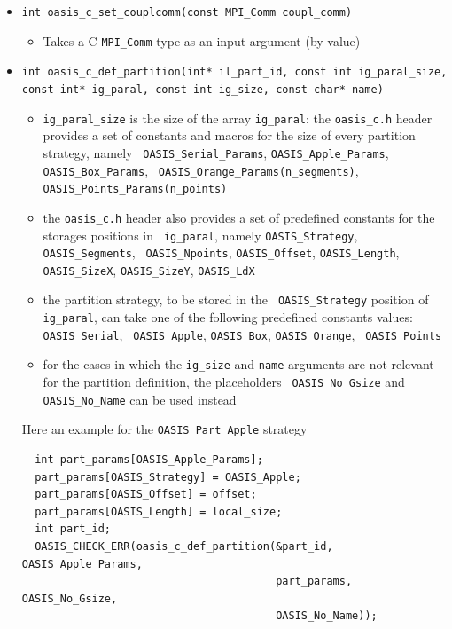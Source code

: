 \begin{itemize}
\begin{itemize}
  \item {\tt coupl\_comm} is a C {\tt MPI\_Comm*} type output argument (by reference)
  \end{itemize}

\vspace{0.2cm}
\item {\tt int oasis\_c\_set\_couplcomm(const MPI\_Comm coupl\_comm)}
  \begin{itemize}
  \item Takes a C {\tt MPI\_Comm} type as an input argument (by value)
  \end{itemize}

\vspace{0.2cm}
\item {\tt int oasis\_c\_def\_partition(int* il\_part\_id, const int ig\_paral\_size, const int* ig\_paral, const int ig\_size, const char* name)}
  \begin{itemize}
  \item {\tt ig\_paral\_size} is the size of the array {\tt ig\_paral}: the
    {\tt oasis\_c.h} header provides a set of constants and macros for
    the size of every partition strategy, namely {\tt
      OASIS\_Serial\_Params}, {\tt OASIS\_Apple\_Params}, {\tt
      OASIS\_Box\_Params}, {\tt
      OASIS\_Orange\_Params(n\_segments)}, {\tt
      OASIS\_Points\_Params(n\_points)}
  \item the {\tt oasis\_c.h} header also provides a set of predefined
    constants for the storages positions in {\tt
    ig\_paral}, namely {\tt OASIS\_Strategy}, {\tt OASIS\_Segments}, {\tt
    OASIS\_Npoints}, {\tt OASIS\_Offset}, {\tt OASIS\_Length}, {\tt
    OASIS\_SizeX}, {\tt OASIS\_SizeY}, {\tt OASIS\_LdX}
  \item the partition strategy, to be stored in the {\tt
    OASIS\_Strategy} position of {\tt ig\_paral}, can take one of the
    following predefined constants values: {\tt OASIS\_Serial}, {\tt
      OASIS\_Apple}, {\tt OASIS\_Box}, {\tt OASIS\_Orange}, {\tt
      OASIS\_Points}
  \item for the cases in which the {\tt ig\_size} and {\tt name}
    arguments are
    not relevant for the partition definition, the placeholders {\tt
      OASIS\_No\_Gsize} and {\tt OASIS\_No\_Name} can be used instead
  \end{itemize}
  Here an example for the {\tt OASIS\_Part\_Apple} strategy
\begin{verbatim}
  int part_params[OASIS_Apple_Params];
  part_params[OASIS_Strategy] = OASIS_Apple;
  part_params[OASIS_Offset] = offset;
  part_params[OASIS_Length] = local_size;
  int part_id;
  OASIS_CHECK_ERR(oasis_c_def_partition(&part_id, OASIS_Apple_Params,
                                        part_params, OASIS_No_Gsize,
                                        OASIS_No_Name));
\end{verbatim}


\end{itemize}
